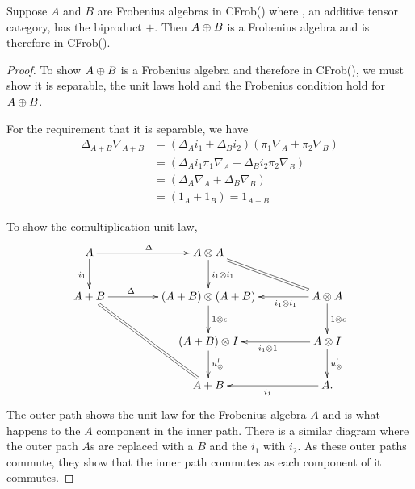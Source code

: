 \begin{lemma}\label{prop:biproducts-of-frobenius-objects-are-frobenius}
  Suppose $A$ and $B$ are Frobenius algebras in CFrob(\X) where \X, an additive tensor category, has
  the biproduct $+$.
  Then $A\oplus B$ is a Frobenius algebra and is therefore in CFrob(\X).
\end{lemma}
\begin{proof}

  To show $A\oplus B$ is a Frobenius algebra and therefore in CFrob(\X), we must show it is separable,
  the unit laws hold and the Frobenius condition hold for $A\oplus B$.

  For the requirement that it is separable, we have
  \begin{align*}
    \Delta_{A+B}\nabla_{A+B}&= (\Delta_A i_1 + \Delta_B i_2) (\pi_1 \nabla_A + \pi_2 \nabla_B)\\
    &=  (\Delta_A i_1 \pi_1 \nabla_A + \Delta_B i_2\pi_2 \nabla_B)\\
    &=  (\Delta_A \nabla_A + \Delta_B \nabla_B)\\
    &=  (1_A + 1_B) = 1_{A+B}
  \end{align*}


  To show the comultiplication unit law,
  \[
     \xymatrix@C+20pt{
       A \ar[r]^{\Delta} \ar[d]_{i_1} & A\*A \ar[d]^{i_1\*i_1} \ar@{=}[dr] \\
       A+B \ar[r]^(.35){\Delta} \ar@{=}[ddr] &(A+B)\*(A+B) \ar[d]^{1\*\epsilon}
          & A\*A \ar[l]^(.35){i_1\*i_1}  \ar[d]^{1\*\epsilon}\\
       & (A+B)\*I \ar[d]^{\usl} & A\*I \ar[d]^{\usl} \ar[l]^{i_1\*1}\\
       & A+B & A. \ar[l]^{i_1}
     }
  \]
  The outer path shows the unit law for the Frobenius algebra $A$ and is what happens to the $A$
  component in the inner path. There is a similar diagram where the outer path $A$s are replaced
  with a $B$ and the $i_1$ with $i_2$. As these outer paths commute, they show that the inner path
  commutes as each component of it commutes.


\end{proof}
